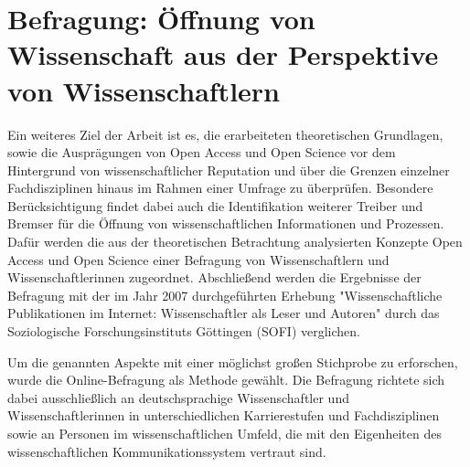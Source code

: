\chapter{Befragung: Öffnung von Wissenschaft aus der Perspektive von Wissenschaftlern}

Ein weiteres Ziel der Arbeit ist es, die erarbeiteten theoretischen Grundlagen, sowie die Ausprägungen von Open Access und Open Science vor dem Hintergrund von wissenschaftlicher Reputation und über die Grenzen einzelner Fachdisziplinen hinaus im Rahmen einer Umfrage zu überprüfen. Besondere Berücksichtigung findet dabei auch die Identifikation weiterer Treiber und Bremser für die Öffnung von wissenschaftlichen Informationen und Prozessen. Dafür werden die aus der theoretischen Betrachtung analysierten Konzepte Open Access und Open Science einer Befragung von Wissenschaftlern und Wissenschaftlerinnen zugeordnet. Abschließend werden die Ergebnisse der Befragung mit der im Jahr 2007 durchgeführten Erhebung "Wissenschaftliche Publikationen im Internet: Wissenschaftler als Leser und Autoren" durch das Soziologische Forschungsinstituts Göttingen (SOFI) verglichen.

Um die genannten Aspekte mit einer möglichst großen Stichprobe zu erforschen, wurde die Online-Befragung als Methode gewählt. Die Befragung richtete sich dabei ausschließlich an deutschsprachige Wissenschaftler und Wissenschaftlerinnen in  unterschiedlichen Karrierestufen und Fachdisziplinen sowie an Personen im wissenschaftlichen Umfeld, die mit den Eigenheiten des wissenschaftlichen Kommunikationssystem vertraut sind.

